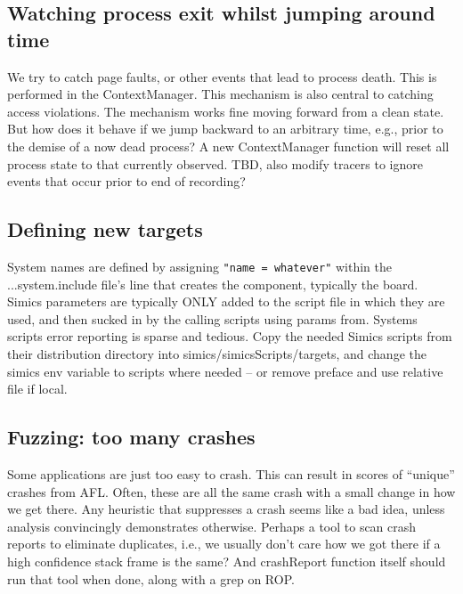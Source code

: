\documentclass[titlepage]{article}
\begin{document}
\begin{appendices}

\subsection{Watching process exit whilst jumping around time}
We try to catch page faults, or other events that lead to process death.  This is performed in the ContextManager.  
This mechanism is also central to catching access violations.  The mechanism works fine moving forward from a clean state.  But
how does it behave if we jump backward to an arbitrary time, e.g., prior to the demise of a now dead process?  A new ContextManager function
will reset all process state to that currently observed.  TBD, also modify tracers to ignore events that occur prior to end of recording?

\subsection{Defining new targets}
System names are defined by assigning {\tt "name = whatever"} within the ...system.include file's line that creates the component, typically the board.
Simics parameters are typically ONLY added to the script file in which they are used, and then sucked in by the calling scripts using params from.
Systems scripts error reporting is sparse and tedious.   Copy the needed Simics scripts from their distribution directory into simics/simicsScripts/targets,
and change the simics env variable to scripts where needed -- or remove preface and use relative file if local. 

\subsection{Fuzzing: too many crashes}
Some applications are just too easy to crash.  This can result in scores of ``unique'' crashes from AFL.  Often, these are all the same
crash with a small change in how we get there.  Any heuristic that suppresses a crash seems like a bad idea, unless analysis convincingly demonstrates otherwise.
Perhaps a tool to scan crash reports to eliminate duplicates, i.e., we usually don't care how we got there if a high confidence stack frame is the same?
And crashReport function itself should run that tool when done, along with a grep on ROP.


\end{appendices}
\end{document}
